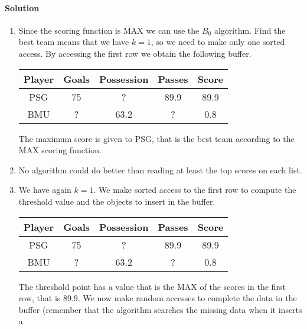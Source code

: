 \paragraph*{Solution}
\begin{enumerate}
    \item Since the scoring function is MAX we can use the $B_0$ algorithm. Find the best team means that we have $k=1$, so we 
        need to make only one sorted access. By accessing the first row we obtain the following buffer. 
        \begin{table}[H]
            \centering
            \begin{tabular}{c|ccc|c}
            \hline
            \textbf{Player} & \textbf{Goals} & \textbf{Possession} & \textbf{Passes} & \textbf{Score} \\ \hline
            PSG             & 75             & ?                   & 89.9            & 89.9           \\
            BMU             & ?              & 63.2                & ?               & 0.8            \\ \hline
            \end{tabular}
        \end{table}
        The maximum score is given to PSG, that is the best team according to the MAX scoring function. 
    \item No algorithm could do better than reading at least the top scores on each list. 
    \item We have again $k=1$. We make sorted access to the first row to compute the threshold value and 
        the objects to insert in the buffer. 
        \begin{table}[H]
            \centering
            \begin{tabular}{c|ccc|c}
            \hline
            \textbf{Player} & \textbf{Goals} & \textbf{Possession} & \textbf{Passes} & \textbf{Score} \\ \hline
            PSG             & 75             & ?                   & 89.9            & 89.9           \\
            BMU             & ?              & 63.2                & ?               & 0.8            \\ \hline
            \end{tabular}
        \end{table}
        The threshold point has a value that is the MAX of the scores in the first row, that is $89.9$. We now make random 
        accesses to complete the data in the buffer (remember that the algorithm searches the missing data when it inserts a 

\end{enumerate}
